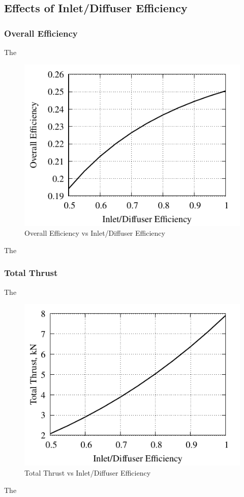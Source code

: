 \documentclass[conf]{new-aiaa} %
\begin{document}
\subsection{Effects of Inlet/Diffuser Efficiency} %

\subsubsection{Overall Efficiency}
The

\begin{figure}[H] %
    \centering
    \includegraphics[]{media/performance_parameter_files/part_f_eta_o.pdf}
    \caption{\label{fig:partfetao}Overall Efficiency vs Inlet/Diffuser Efficiency}
\end{figure}
The

\subsubsection{Total Thrust}
The

\begin{figure}[H] %
    \centering
    \includegraphics[]{media/performance_parameter_files/part_f_T.pdf}
    \caption{\label{fig:partft}Total Thrust vs Inlet/Diffuser Efficiency}
\end{figure}
The
\end{document}
